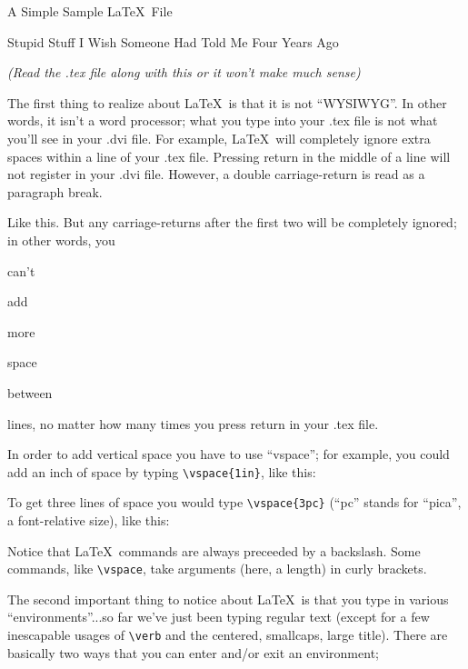 \documentclass{article}
\begin{document}
\centerline{\sc \large A Simple Sample \LaTeX\ File}
\vspace{.5pc}
\centerline{\sc Stupid Stuff I Wish Someone Had Told Me Four Years Ago}
\centerline{\it (Read the .tex file along with this or it won't 
            make much sense)}
\vspace{2pc}

The first thing to realize about \LaTeX\ is that it is not ``WYSIWYG''. 
In other words, it isn't a word processor; what you type into your 
.tex file is not what you'll see in your .dvi file.  For example, 
\LaTeX\ will      completely     ignore               extra
spaces    within                             a line of your .tex file.
Pressing return
in 
the 
middle 
of
a
line
will not register in your .dvi file. However, a double carriage-return
is read as a paragraph break.

Like this.  But any carriage-returns after the first two will be 
completely ignored; in other words, you 


can't 

add






more 




space 


between 




lines, no matter how many times you press return in your .tex file.

In order to add vertical space you have to use ``vspace''; for example, 
you could add an inch of space by typing \verb|\vspace{1in}|, like this:
\vspace{1in}

To get three lines of space you would type \verb|\vspace{3pc}|
(``pc'' stands for ``pica'', a font-relative size), like this:
\vspace{3pc}

Notice that \LaTeX\ commands are always preceeded by a backslash.  
Some commands, like \verb|\vspace|, take arguments (here, a length) in
curly brackets.  

The second important thing to notice about \LaTeX\ is that you type 
in various ``environments''...so far we've just been typing regular 
text (except for a few inescapable usages of \verb|\verb| and the
centered, smallcaps, large title).  There are basically two ways that 
you can enter and/or exit an environment;
\vspace{1pc}
\end{document}
